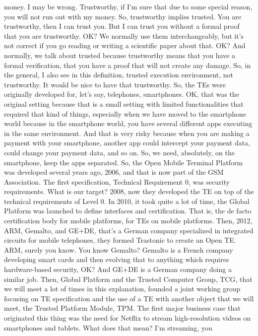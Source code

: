  money. I may be wrong. Trustworthy, if I'm sure that due to some special
 reason, you will not run out with my money. So, trustworthy implies trusted.
 You are trustworthy, then I can trust you. But I can trust you without a
 formal proof that you are trustworthy. OK? We normally use them
 interchangeably, but it's not correct if you go reading or writing a
 scientific paper about that. OK? And normally, we talk about trusted because
 trustworthy means that you have a formal verification, that you have a proof
 that will not create any damage. So, in the general, I also see in this
 definition, trusted execution environment, not trustworthy. It would be nice
 to have that trustworthy. So, the TEs were originally developed for, let's
 say, telephones, smartphones. OK, that was the original setting because that
 is a small setting with limited functionalities that required that kind of
 things, especially when we have moved to the smartphone world because in the
 smartphone world, you have several different apps executing in the same
 environment. And that is very risky because when you are making a payment with
 your smartphone, another app could intercept your payment data, could change
 your payment data, and so on. So, we need, absolutely, on the smartphone, keep
 the apps separated. So, the Open Mobile Terminal Platform was developed
 several years ago, 2006, and that is now part of the GSM Association. The
 first specification, Technical Requirement 0, was security requirements. What
 is our target? 2008, now they developed the TE on top of the technical
 requirements of Level 0. In 2010, it took quite a lot of time, the Global
 Platform was launched to define interfaces and certification. That is, the de
 facto certification body for mobile platforms, for TEs on mobile platforms.
 Then, 2012, ARM, Gemalto, and GE+DE, that's a German company specialized in
 integrated circuits for mobile telephones, they formed Trastonic to create an
 Open TE. ARM, surely you know. You know Gemalto? Gemalto is a French company
 developing smart cards and then evolving that to anything which requires
 hardware-based security, OK? And GE+DE is a German company doing a similar
 job. Then, Global Platform and the Trusted Computer Group, TCG, that we will
 meet a lot of times in this explanation, founded a joint working group
 focusing on TE specification and the use of a TE with another object that we
 will meet, the Trusted Platform Module, TPM. The first major business case
 that originated this thing was the need for Netflix to stream high-resolution
 videos on smartphones and tablets. What does that mean? I'm streaming, you

